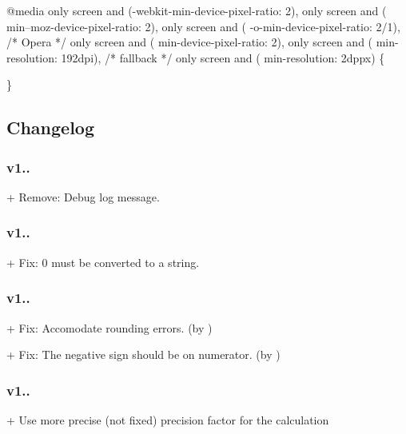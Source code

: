 \begin{DoxyCode}
@media
  only screen and (-webkit-min-device-pixel-ratio: 2),
  only screen and (   min--moz-device-pixel-ratio: 2),
  only screen and (     -o-min-device-pixel-ratio: 2/1), /* Opera */
  only screen and (        min-device-pixel-ratio: 2),
  only screen and (                min-resolution: 192dpi), /* fallback */
  only screen and (                min-resolution: 2dppx) \{ 

\}
\end{DoxyCode}


\subsection*{Changelog}

\subsubsection*{v1..}


\begin{DoxyItemize}
\item + Remove\+: Debug log message.
\end{DoxyItemize}

\subsubsection*{v1..}


\begin{DoxyItemize}
\item + Fix\+: 0 must be converted to a string.
\end{DoxyItemize}

\subsubsection*{v1..}


\begin{DoxyItemize}
\item + Fix\+: Accomodate rounding errors. (by )
\item + Fix\+: The negative sign should be on numerator. (by )
\end{DoxyItemize}

\subsubsection*{v1..}


\begin{DoxyItemize}
\item + Use more precise (not fixed) precision factor for the calculation
\end{DoxyItemize}


